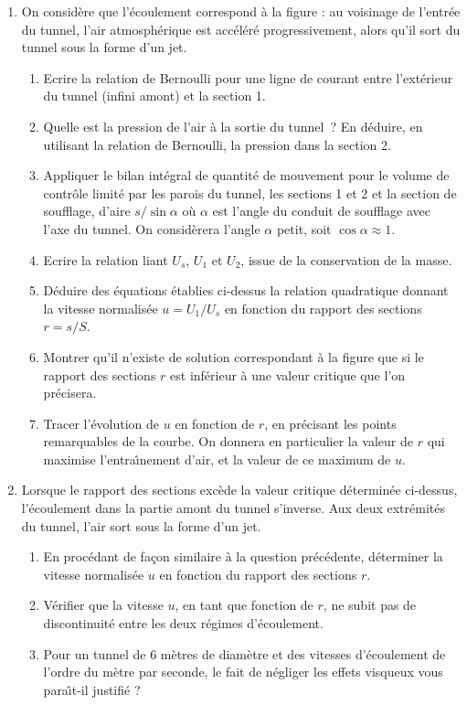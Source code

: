 \begin{enumerate}

\item 
  On consid\`ere que l'\'ecoulement correspond \`a la figure : 
  au voisinage de l'entr\'ee du tunnel, l'air atmosph\'erique est acc\'el\'er\'e progressivement, 
  alors qu'il sort du tunnel sous la forme d'un jet.
  \begin{enumerate}
  \item 
    Ecrire la relation de Bernoulli pour une ligne de courant entre l'ext\'erieur du tunnel 
    (infini amont) et la section 1.
  \item 
    Quelle est la pression de l'air \`a la sortie du tunnel~? 
    En d\'eduire, en utilisant la relation de Bernoulli, la pression dans la section 2.
  \item 
    Appliquer le bilan int\'egral de quantit\'e de mouvement pour 
    le volume de contr\^ole limit\'e par les parois du tunnel, les sections 1 et 2 et 
    la section de soufflage, d'aire $s/\sin \alpha$ o\`u $\alpha$ est l'angle du conduit 
    de soufflage avec l'axe du tunnel. 
    On consid\`erera l'angle $\alpha$ petit, soit $\cos \alpha \approx 1$.
  \item 
    Ecrire la relation liant $U_s$, $U_1$ et $U_2$, issue de la conservation de la masse.
  \item 
    D\'eduire des \'equations \'etablies ci-dessus la relation quadratique donnant 
    la vitesse normalis\'ee $u = U_1/U_s$ en fonction du rapport des sections $r = s/S$. 
  \item 
    Montrer qu'il n'existe de solution correspondant \`a la figure que si le rapport des 
    sections $r$ est inf\'erieur \`a une valeur critique que l'on pr\'ecisera.
  \item 
    Tracer l'\'evolution de $u$ en fonction de $r$, en pr\'ecisant les points remarquables 
    de la courbe. On donnera en particulier la valeur de $r$ qui maximise l'entra\^{\i}nement 
    d'air, et la valeur de ce maximum de $u$.
  \end{enumerate}
  
\item 
  Lorsque le rapport des sections exc\`ede la valeur critique d\'etermin\'ee ci-dessus, 
  l'\'ecoulement dans la partie amont du tunnel s'inverse. 
  Aux deux extr\'emit\'es du tunnel, l'air sort sous la forme d'un jet.
  \begin{enumerate}
  \item 
    En proc\'edant de fa\c{c}on similaire \`a la question pr\'ec\'edente, 
    d\'eterminer la vitesse normalis\'ee $u$ en fonction du rapport des sections $r$.
  \item 
    V\'erifier que la vitesse $u$, en tant que fonction de $r$, ne subit pas de discontinuit\'e 
    entre les deux r\'egimes d'\'ecoulement.
  \item 
    Pour un tunnel de 6 m\`etres de diam\`etre et des vitesses d'\'ecoulement de l'ordre 
    du m\`etre par seconde, le fait de n\'egliger les effets visqueux vous para\^{\i}t-il 
    justifi\'e ?
  \end{enumerate}
  
\end{enumerate}



